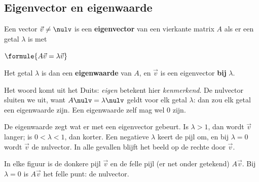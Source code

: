 \subsection{Eigenvector en eigenwaarde}

\begin{theorie}
Een vector $\vec v \neq \nulv$ is een \textbf{\textcolor{accent}{eigenvector}} van een vierkante matrix $A$ als er een getal $\lambda$ is met

\vspace{1mm}
\qquad $\formule{A\vec v = \lambda\vec v}$

\vspace{1mm}
Het getal $\lambda$ is dan een \textbf{\textcolor{accent}{eigenwaarde}} van $A$, en $\vec v$ is een eigenvector \textbf{\textcolor{accent}{bij}} $\lambda$.
\end{theorie}

Het woord komt uit het Duits: \textit{eigen} betekent hier \textit{kenmerkend}. De nulvector sluiten we uit, want $A\nulv = \lambda\nulv$ geldt voor elk getal $\lambda$: dan zou elk getal een eigenwaarde zijn. Een eigenwaarde zelf mag wel 0 zijn.

De eigenwaarde zegt wat er met een eigenvector gebeurt. Is $\lambda > 1$, dan wordt $\vec v$ langer; is $0 < \lambda < 1$, dan korter. Een negatieve $\lambda$ keert de pijl om, en bij $\lambda = 0$ wordt $\vec v$ de nulvector. In alle gevallen blijft het beeld op de rechte door $\vec v$.


\noindent In elke figuur is de donkere pijl $\vec v$ en de felle pijl (er net onder getekend) $A\vec v$. Bij $\lambda = 0$ is $A\vec v$ het felle punt: de nulvector.

